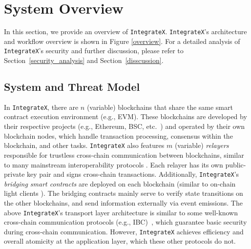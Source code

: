 \section{System Overview}

In this section, we provide an overview of \texttt{IntegrateX}. 
\texttt{IntegrateX}'s architecture and workflow overview is shown in Figure \ref{overview}.
For a detailed analysis of \texttt{IntegrateX}'s security and further discussion, please refer to Section~\ref{security_analysis} and Section~\ref{disscussion}.

\subsection{System and Threat Model}

In \texttt{IntegrateX}, there are $n$ (variable) blockchains that share the same smart contract execution environment (e.g., EVM). 
These blockchains are developed by their respective projects (e.g., Ethereum, BSC, etc.~\cite{eth,bsc_whitepaper}) and operated by their own blockchain nodes, which handle transaction processing, consensus within the blockchain, and other tasks. 
\texttt{IntegrateX} also features $m$ (variable) \emph{relayers} responsible for trustless cross-chain communication between blockchains, similar to many mainstream interoperability protocols \cite{atomic-ibc, cosmos2019, sheng2023trustboost, tas2023interchain}. 
Each relayer has its own public-private key pair and signs cross-chain transactions.
Additionally, \texttt{IntegrateX}'s \emph{bridging smart contracts} are deployed on each blockchain (similar to on-chain light clients \cite{cosmos2019, atomic-ibc}). 
The bridging contracts mainly serve to verify state transitions on the other blockchains, and send information externally via event emissions.
The above \texttt{IntegrateX}'s transport layer architecture is similar to some well-known cross-chain communication protocols (e.g., IBC)~\cite{cosmos2019, atomic-ibc}, which guarantee basic security during cross-chain communication. 
However, \texttt{IntegrateX} achieves efficiency and overall atomicity at the application layer, which these other protocols do not.

